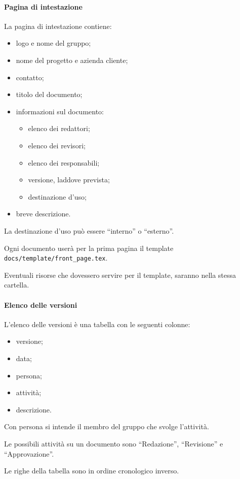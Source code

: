 \documentclass[a4paper, 12pt]{article}
\begin{document}
\paragraph{Pagina di intestazione}
La pagina di intestazione contiene:
\begin{itemize}
\item logo e nome del gruppo;
\item nome del progetto e azienda cliente;
\item contatto;
\item titolo del documento;
\item informazioni sul documento:
\begin{itemize}
	\item elenco dei redattori;
	\item elenco dei revisori;
	\item elenco dei responsabili;
	\item versione, laddove prevista;
	\item destinazione d'uso;
\end{itemize}
\item breve descrizione.
\end{itemize}

La destinazione d'uso può essere ``interno'' o ``esterno''.

Ogni documento userà per la prima pagina il template \texttt{docs/template/front\_page.tex}.

Eventuali risorse che dovessero servire per il template, saranno nella stessa cartella.

\paragraph{Elenco delle versioni}
L'elenco delle versioni è una tabella con le seguenti colonne:
\begin{itemize}
\item versione;
\item data;
\item persona;
\item attività;
\item descrizione.
\end{itemize}

Con persona si intende il membro del gruppo che svolge l'attività.

Le possibili attività su un documento sono ``Redazione'', ``Revisione'' e ``Approvazione''.

Le righe della tabella sono in ordine cronologico inverso.
\end{document}
